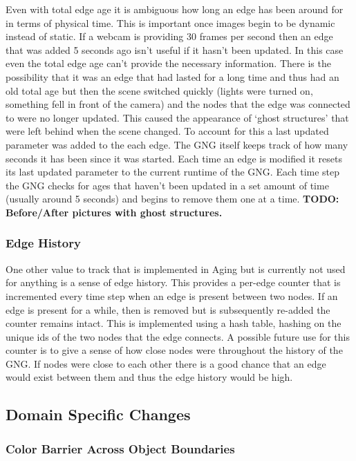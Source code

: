 \documentclass{article}
\renewcommand{\|}{\origbar} %
\begin{document}
Even with total edge age it is ambiguous how long an edge has been around for in terms of physical time. This is important once images begin to be dynamic instead of static. If a webcam is providing 30 frames per second then an edge that was added 5 seconds ago isn't useful if it hasn't been updated. In this case even the total edge age can't provide the necessary information. There is the possibility that it was an edge that had lasted for a long time and thus had an old total age but then the scene switched quickly (lights were turned on, something fell in front of the camera) and the nodes that the edge was connected to were no longer updated. This caused the appearance of `ghost structures' that were left behind when the scene changed. To account for this a last updated parameter was added to the each edge. The GNG itself keeps track of how many seconds it has been since it was started. Each time an edge is modified it resets its last updated parameter to the current runtime of the GNG. Each time step the GNG checks for ages that haven't been updated in a set amount of time (usually around 5 seconds) and begins to remove them one at a time. {\bf TODO: Before/After pictures with ghost structures.}

\subsubsection{Edge History}

One other value to track that is implemented in Aging but is currently not used for anything is a sense of edge history. This provides a per-edge counter that is incremented every time step when an edge is present between two nodes. If an edge is present for a while, then is removed but is subsequently re-added the counter remains intact. This is implemented using a hash table, hashing on the unique ids of the two nodes that the edge connects. A possible future use for this counter is to give a sense of how close nodes were throughout the history of the GNG. If nodes were close to each other there is a good chance that an edge would exist between them and thus the edge history would be high.

\subsection{Domain Specific Changes}

\subsubsection{Color Barrier Across Object Boundaries}
\end{document}
